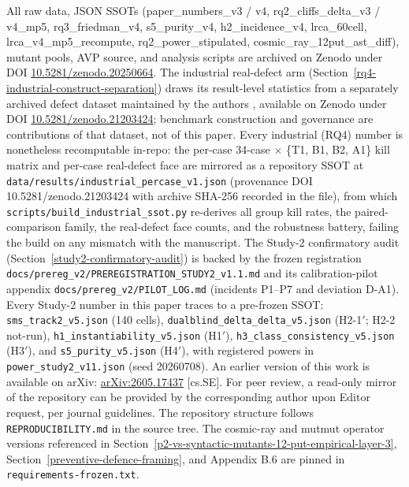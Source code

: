 \documentclass[manuscript,screen,review]{acmart}
\begin{document}
All raw data, JSON SSOTs (paper\_numbers\_v3 / v4,
rq2\_cliffs\_delta\_v3 / v4\_mp5, rq3\_friedman\_v4, s5\_purity\_v4,
h2\_incidence\_v4, lrca\_60cell,
lrca\_v4\_mp5\_recompute, rq2\_power\_stipulated,
cosmic\_ray\_12put\_ast\_diff), mutant pools, AVP source, and analysis
scripts are archived on Zenodo under DOI
\href{https://doi.org/10.5281/zenodo.20250664}{10.5281/zenodo.20250664}.
The industrial real-defect arm (Section~\ref{rq4-industrial-construct-separation}) draws its result-level
statistics from a separately archived defect dataset maintained by the
authors \citep{defect4mr2026}, available on Zenodo under DOI
\href{https://doi.org/10.5281/zenodo.21203424}{10.5281/zenodo.21203424};
benchmark construction and governance are contributions of that dataset,
not of this paper. Every industrial (RQ4) number is nonetheless
recomputable in-repo: the per-case 34-case $\times$ \{T1, B1, B2, A1\}
kill matrix and per-case real-defect face are mirrored as a repository
SSOT at \texttt{data/results/industrial\_percase\_v1.json} (provenance
DOI 10.5281/zenodo.21203424 with archive SHA-256 recorded in the file),
from which \texttt{scripts/build\_industrial\_ssot.py} re-derives all
group kill rates, the paired-comparison family, the real-defect face
counts, and the robustness battery, failing the build on any mismatch
with the manuscript.
The Study-2 confirmatory audit
(Section~\ref{study2-confirmatory-audit}) is backed by the frozen
registration \texttt{docs/prereg\_v2/PREREGISTRATION\_STUDY2\_v1.1.md}
and its calibration-pilot appendix \texttt{docs/prereg\_v2/PILOT\_LOG.md}
(incidents P1--P7 and deviation D-A1). Every Study-2 number in this paper
traces to a pre-frozen SSOT: \texttt{sms\_track2\_v5.json} (140 cells),
\texttt{dualblind\_delta\_delta\_v5.json} (H2-1\('\); H2-2 not-run),
\texttt{h1\_instantiability\_v5.json} (H1\('\)),
\texttt{h3\_class\_consistency\_v5.json} (H3\('\)), and
\texttt{s5\_purity\_v5.json} (H4\('\)), with registered powers in
\texttt{power\_study2\_v11.json} (seed 20260708).
An earlier version of this work is available on arXiv:
\href{https://arxiv.org/abs/2605.17437}{arXiv:2605.17437} [cs.SE].
For peer review, a read-only mirror of the repository can
be provided by the corresponding author upon Editor request, per journal
guidelines. The repository structure follows
\texttt{REPRODUCIBILITY.md} in the source tree. The cosmic-ray and
mutmut operator versions referenced in Section~\ref{p2-vs-syntactic-mutants-12-put-empirical-layer-3}, Section~\ref{preventive-defence-framing}, and Appendix B.6 are
pinned in \texttt{requirements-frozen.txt}.
\end{document}
